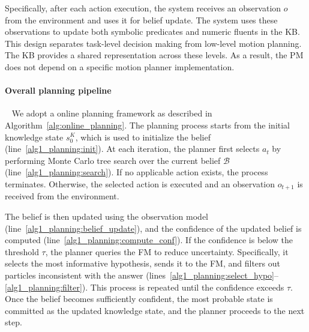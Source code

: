Specifically, after each action execution, the system receives an observation $o$ from the environment and uses it for belief update. The system uses these observations to update both symbolic predicates and numeric fluents in the KB. This design separates task-level decision making from low-level motion planning. The KB provides a shared representation across these levels. As a result, the PM does not depend on a specific motion planner implementation.



\paragraph{Overall planning pipeline}~\label{method:planning}
We adopt a online planning framework as described in Algorithm~\ref{alg:online_planning}. The planning process starts from the initial knowledge state $s^{K}_{0}$, which is used to initialize the belief (line~\ref{alg1_planning:init}). At each iteration, the planner first selects $a_t$ by performing Monte Carlo tree search over the current belief $\mathcal{B}$ (line~\ref{alg1_planning:search}). If no applicable action exists, the process terminates. Otherwise, the selected action is executed and an observation $o_{t+1}$ is received from the environment.

The belief is then updated using the observation model (line~\ref{alg1_planning:belief_update}), and the confidence of the updated belief is computed (line~\ref{alg1_planning:compute_conf}). If the confidence is below the threshold $\tau$, the planner queries the FM to reduce uncertainty. Specifically, it selects the most informative hypothesis, sends it to the FM, and filters out particles inconsistent with the answer (lines~\ref{alg1_planning:select_hypo}--\ref{alg1_planning:filter}). This process is repeated until the confidence exceeds $\tau$. Once the belief becomes sufficiently confident, the most probable state is committed as the updated knowledge state, and the planner proceeds to the next step.





